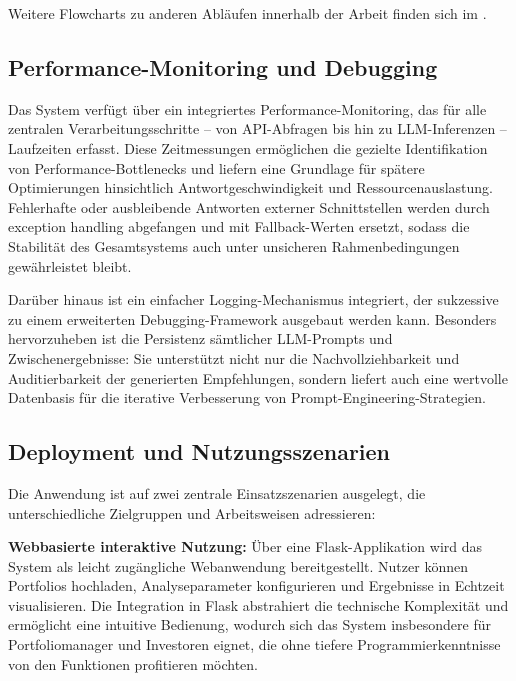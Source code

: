      Weitere Flowcharts zu anderen Abläufen innerhalb der Arbeit finden sich im .

    \subsection{Performance-Monitoring und Debugging}

      Das System verfügt über ein integriertes Performance-Monitoring, das für alle zentralen Verarbeitungsschritte -- von API-Abfragen bis hin zu \acs{LLM}-Inferenzen -- Laufzeiten erfasst.
      Diese Zeitmessungen ermöglichen die gezielte Identifikation von Performance-Bottlenecks und liefern eine Grundlage für spätere Optimierungen hinsichtlich Antwortgeschwindigkeit und Ressourcenauslastung.
      Fehlerhafte oder ausbleibende Antworten externer Schnittstellen werden durch exception handling abgefangen und mit Fallback-Werten ersetzt, sodass die Stabilität des Gesamtsystems auch unter unsicheren Rahmenbedingungen gewährleistet bleibt.

      Darüber hinaus ist ein einfacher Logging-Mechanismus integriert, der sukzessive zu einem erweiterten Debugging-Framework ausgebaut werden kann.
      Besonders hervorzuheben ist die Persistenz sämtlicher \acs{LLM}-Prompts und Zwischenergebnisse:
      Sie unterstützt nicht nur die Nachvollziehbarkeit und Auditierbarkeit der generierten Empfehlungen, sondern liefert auch eine wertvolle Datenbasis für die iterative Verbesserung von Prompt-Engineering-Strategien.


    \subsection{Deployment und Nutzungsszenarien}

      Die Anwendung ist auf zwei zentrale Einsatzszenarien ausgelegt, die unterschiedliche Zielgruppen und Arbeitsweisen adressieren:

      \textbf{Webbasierte interaktive Nutzung:}
      Über eine Flask-Applikation wird das System als leicht zugängliche Webanwendung bereitgestellt.
      Nutzer können Portfolios hochladen, Analyseparameter konfigurieren und Ergebnisse in Echtzeit visualisieren.
      Die Integration in Flask abstrahiert die technische Komplexität und ermöglicht eine intuitive Bedienung, wodurch sich das System insbesondere für Portfoliomanager und Investoren eignet, die ohne tiefere Programmierkenntnisse von den Funktionen profitieren möchten.

